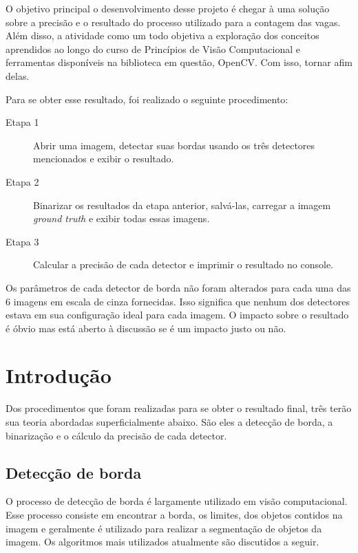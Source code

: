 \documentclass[10pt,twocolumn,letterpaper]{article}
\begin{document}
	O objetivo principal o desenvolvimento desse projeto é chegar à uma solução sobre
a precisão e o resultado do processo utilizado para a contagem das vagas. Além disso, a
atividade como um todo objetiva a exploração dos conceitos aprendidos ao longo do curso
de Princípios de Visão Computacional e ferramentas disponíveis na biblioteca em questão,
OpenCV{\footnotesize \cite{opencv}}. Com isso, tornar afim delas.



Para se obter esse resultado, foi
realizado o seguinte procedimento:

\begin{description}
\item [Etapa 1] Abrir uma imagem, detectar suas bordas usando os três detectores mencionados e exibir o resultado.
\item [Etapa 2] Binarizar os resultados da etapa anterior, salvá-las, carregar a imagem \emph{ground truth} e exibir todas essas imagens.
\item [Etapa 3] Calcular a precisão de cada detector e imprimir o resultado no console.
\end{description}

Os parâmetros de cada detector de borda não foram alterados para cada uma das 6 imagens em escala de cinza fornecidas. Isso significa que nenhum dos detectores estava em sua configuração ideal para cada imagem. O impacto sobre o resultado é óbvio mas está aberto à discussão se é um impacto justo ou não.


\section{Introdução}
Dos procedimentos que foram realizadas para se obter o resultado final, três terão sua teoria abordadas superficialmente abaixo. São eles a detecção de borda, a binarização e o cálculo da precisão de cada detector.

\subsection{Detecção de borda}
O processo de detecção de borda é largamente utilizado em visão computacional.\cite{theory} Esse processo consiste em encontrar a borda, os limites, dos objetos contidos na imagem e geralmente é utilizado para realizar a segmentação de objetos da imagem. Os algoritmos mais utilizados atualmente são discutidos a seguir.
\end{document}
